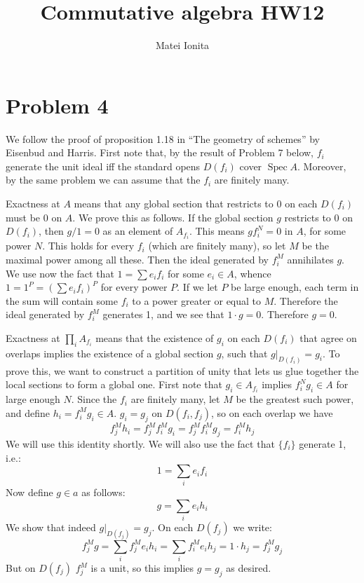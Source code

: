 \documentclass[12 pt]{article}
\title{Commutative algebra HW12}
\author{Matei Ionita}
\DeclareMathOperator{\Spec}{Spec}
\begin{document}
  \maketitle

\section*{Problem 4}
We follow the proof of proposition 1.18 in ``The geometry of schemes'' by Eisenbud and Harris. First note that, by the result of Problem 7 below, $f_i$ generate the unit ideal iff the standard opens $D(f_i)$ cover $\Spec A$. Moreover, by the same problem we can assume that the $f_i$ are finitely many. 

Exactness at $A$ means that any global section that restricts to 0 on each $D(f_i)$ must be 0 on $A$. We prove this as follows. If the global section $g$ restricts to 0 on $D(f_i)$, then $g/1 = 0$ as an element of $A_{f_i}$. This means $g f_i^N = 0$ in $A$, for some power $N$. This holds for every $f_i$ (which are finitely many), so let $M$ be the maximal power among all these. Then the ideal generated by $f_i^M$ annihilates $g$. We use now the fact that $1 = \sum e_i f_i$ for some $e_i \in A$, whence $1 = 1^P = \left( \sum e_i f_i \right)^P$ for every power $P$. If we let $P$ be large enough, each term in the sum will contain some $f_i$ to a power greater or equal to $M$. Therefore the ideal generated by $f_i^M$ generates 1, and we see that $1 \cdot g = 0$. Therefore $g=0$.

Exactness at $\prod_i A_{f_i}$ means that the existence of $g_i$ on each $D(f_i)$ that agree on overlaps implies the existence of a global section $g$, such that $g|_{D(f_i)} = g_i$. To prove this, we want to construct a partition of unity that lets us glue together the local sections to form a global one. First note that $g_i \in A_{f_i}$ implies $f_i^N g_i \in A$ for large enough $N$. Since the $f_i$ are finitely many, let $M$ be the greatest such power, and define $h_i = f_i^M g_i \in A$. $g_i = g_j$ on $D(f_i, f_j)$, so on each overlap we have
\[          f_j^M h_i = f_j^M f_i^M g_i =  f_j^M f_i^M g_j = f_i^M h_j        \]
We will use this identity shortly. We will also use the fact that $\{ f_i \}$ generate 1, i.e.:
\[           1 = \sum_i e_i f_i      \]
Now define $g\in a$ as follows:
\[          g = \sum_i e_i h_i        \]
We show that indeed $g|_{D(f_j)} = g_j$. On each $D(f_j)$ we write:
\[         f_j^M g = \sum_i f_j^M  e_i h_i = \sum_i f_i^M e_i h_j = 1 \cdot h_j = f_j^M g_j         \]
But on $D(f_j)$ $f_j^M$ is a unit, so this implies $g = g_j$ as desired.
\end{document}
